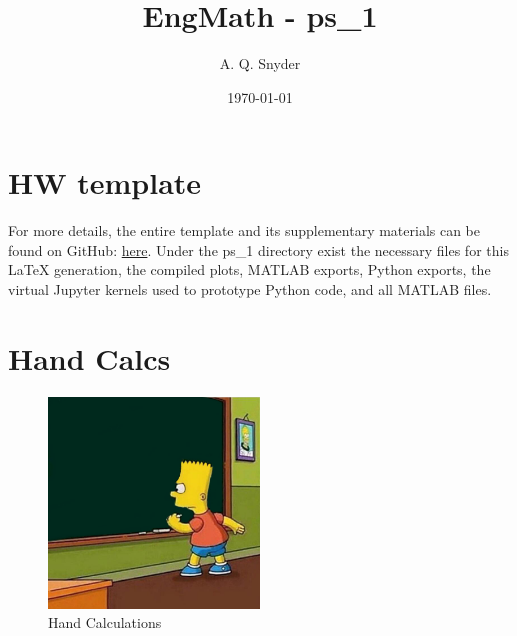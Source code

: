 \documentclass{article}
\begin{document}
\title{EngMath - ps\_1}
\author{A. Q. Snyder}
\date{\today}

\maketitle

\section{HW template}

\noindent
For more details, the entire template and its supplementary materials can be found on GitHub: \href{https://github.com/aqsnyder/eng_math/tree/main/ps_1}{here}.
Under the ps\_1 directory exist the necessary files for this LaTeX generation, the compiled plots, MATLAB exports, Python exports, the virtual Jupyter kernels used to prototype Python code, and all MATLAB files.



\section{Hand Calcs}
\begin{figure}[h]
    \centering
    \includegraphics[width=0.5\textwidth]{misc_media/hand-calcs.jpg}
    \caption{Hand Calculations} %
    \label{fig:hand-calcs}      %
\end{figure}

\vspace{2cm}  %

 
 
 
 
\end{document}
